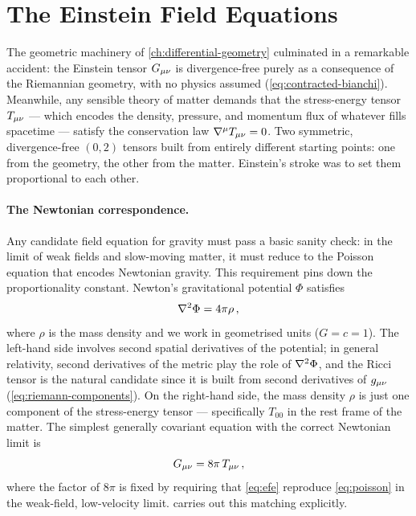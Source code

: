 \section{The Einstein Field Equations}
\label{sec:gr-efe}

The geometric machinery of \cref{ch:differential-geometry} culminated in a
remarkable accident: the Einstein tensor $G_{\mu\nu}$ is divergence-free purely
as a consequence of the Riemannian geometry, with no physics assumed
(\cref{eq:contracted-bianchi}).  Meanwhile, any sensible theory of matter
demands that the stress-energy tensor $T_{\mu\nu}$ --- which encodes the
density, pressure, and momentum flux of whatever fills spacetime --- satisfy
the conservation law $\nabla^\mu T_{\mu\nu} = 0$.  Two symmetric,
divergence-free $(0,2)$ tensors built from entirely different starting
points: one from the geometry, the other from the matter.  Einstein's stroke
was to set them proportional to each other.

\paragraph{The Newtonian correspondence.}

Any candidate field equation for gravity must pass a basic sanity check: in
the limit of weak fields and slow-moving matter, it must reduce to the
Poisson equation that encodes Newtonian gravity.  This requirement pins down
the proportionality constant.  Newton's gravitational potential $\Phi$
satisfies
%
\begin{equation}
  \nabla^{2} \Phi = 4\pi\rho \,,
  \label{eq:poisson}
\end{equation}
%
where $\rho$ is the mass density and we work in geometrised units
($G = c = 1$).  The left-hand side involves second spatial derivatives of the
potential; in general relativity, second derivatives of the metric play the
role of $\nabla^{2} \Phi$, and the Ricci tensor is the natural candidate
since it is built from second derivatives of $g_{\mu\nu}$
(\cref{eq:riemann-components}).  On the right-hand side, the mass density
$\rho$ is just one component of the stress-energy tensor --- specifically
$T_{00}$ in the rest frame of the matter.  The simplest generally covariant
equation with the correct Newtonian limit is
%
\begin{equation}
  G_{\mu\nu} = 8\pi\,T_{\mu\nu} \,,
  \label{eq:efe}
\end{equation}
%
where the factor of $8\pi$ is fixed by requiring that \cref{eq:efe}
reproduce \cref{eq:poisson} in the weak-field, low-velocity limit.
 carries out this matching explicitly.

